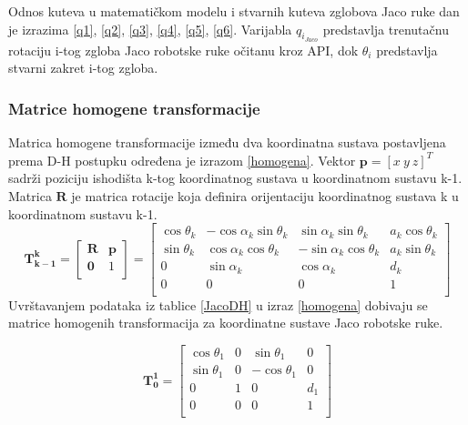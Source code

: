 \documentclass[times, utf8, diplomski, numeric]{fer}
\begin{document}
Odnos kuteva u matematičkom modelu i stvarnih kuteva zglobova Jaco ruke dan je izrazima \ref{q1}, \ref{q2}, \ref{q3}, \ref{q4}, \ref{q5}, \ref{q6}.
Varijabla $q_{i_{Jaco}}$ predstavlja trenutačnu rotaciju i-tog zgloba Jaco robotske ruke očitanu kroz API, dok $\theta_i$ predstavlja stvarni zakret i-tog zgloba.

\subsubsection{Matrice homogene transformacije}
Matrica homogene transformacije između dva koordinatna sustava postavljena prema D-H postupku određena je izrazom \ref{homogena}.
Vektor $\mathbf{p} = [x\ y\ z]^T$ sadrži poziciju ishodišta k-tog koordinatnog sustava u koordinatnom sustavu k-1.
Matrica $\mathbf{R}$ je matrica rotacije koja definira orijentaciju koordinatnog sustava k u koordinatnom sustavu k-1.
\begin{equation}
\mathbf{T_{k-1}^k} =
\begin{bmatrix} 
\mathbf{R} & \mathbf{p}\\ 
\mathbf{0} & 1\\
\end{bmatrix}
=
\begin{bmatrix} 
\cos\theta_{k}& -\cos\alpha_{k}\sin\theta_{k} & \sin\alpha_{k}\sin\theta_{k} & a_k\cos\theta_{k}\\ 
\sin\theta_{k}& \cos\alpha_{k}\cos\theta_{k} & -\sin\alpha_{k}\cos\theta_{k} & a_k\sin\theta_{k}\\
0 & \sin\alpha_{k} & \cos\alpha_{k} & d_{k}\\
0 & 0 & 0 & 1\\
\end{bmatrix}
\label{homogena}
\end{equation}
Uvrštavanjem podataka iz tablice \ref{JacoDH} u izraz \ref{homogena} dobivaju se matrice homogenih transformacija za koordinatne sustave Jaco robotske ruke.

\begin{equation}
\mathbf{T_0^1} =\begin{bmatrix} \cos\theta_{1}& 0 & \sin\theta_{1} & 0\\ 
\sin\theta_{1}& 0 & -\cos\theta_{1} & 0\\
0 & 1 & 0 & d_{1}\\
0 & 0 & 0 & 1\\
\end{bmatrix}
\end{equation}
\end{document}
